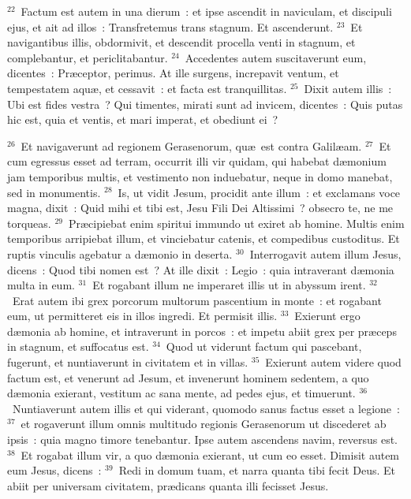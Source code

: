 ${}^{22}$~Factum est autem in una dierum~: et ipse ascendit in naviculam, et discipuli ejus, et ait ad illos~: Transfretemus trans stagnum. Et ascenderunt.
${}^{23}$~Et navigantibus illis, obdormivit, et descendit procella venti in stagnum, et complebantur, et periclitabantur.
${}^{24}$~Accedentes autem suscitaverunt eum, dicentes~: Pr\ae ceptor, perimus. At ille surgens, increpavit ventum, et tempestatem aqu\ae , et cessavit~: et facta est tranquillitas.
${}^{25}$~Dixit autem illis~: Ubi est fides vestra~? Qui timentes, mirati sunt ad invicem, dicentes~: Quis putas hic est, quia et ventis, et mari imperat, et obediunt ei~?


${}^{26}$~Et navigaverunt ad regionem Gerasenorum, qu\ae\ est contra Galil\ae am.
${}^{27}$~Et cum egressus esset ad terram, occurrit illi vir quidam, qui habebat d\ae monium jam temporibus multis, et vestimento non induebatur, neque in domo manebat, sed in monumentis.
${}^{28}$~Is, ut vidit Jesum, procidit ante illum~: et exclamans voce magna, dixit~: Quid mihi et tibi est, Jesu Fili Dei Altissimi~? obsecro te, ne me torqueas.
${}^{29}$~Pr\ae cipiebat enim spiritui immundo ut exiret ab homine. Multis enim temporibus arripiebat illum, et vinciebatur catenis, et compedibus custoditus. Et ruptis vinculis agebatur a d\ae monio in deserta.
${}^{30}$~Interrogavit autem illum Jesus, dicens~: Quod tibi nomen est~? At ille dixit~: Legio~: quia intraverant d\ae monia multa in eum.
${}^{31}$~Et rogabant illum ne imperaret illis ut in abyssum irent.
${}^{32}$~Erat autem ibi grex porcorum multorum pascentium in monte~: et rogabant eum, ut permitteret eis in illos ingredi. Et permisit illis.
${}^{33}$~Exierunt ergo d\ae monia ab homine, et intraverunt in porcos~: et impetu abiit grex per pr\ae ceps in stagnum, et suffocatus est.
${}^{34}$~Quod ut viderunt factum qui pascebant, fugerunt, et nuntiaverunt in civitatem et in villas.
${}^{35}$~Exierunt autem videre quod factum est, et venerunt ad Jesum, et invenerunt hominem sedentem, a quo d\ae monia exierant, vestitum ac sana mente, ad pedes ejus, et timuerunt.
${}^{36}$~Nuntiaverunt autem illis et qui viderant, quomodo sanus factus esset a legione~:
${}^{37}$~et rogaverunt illum omnis multitudo regionis Gerasenorum ut discederet ab ipsis~: quia magno timore tenebantur. Ipse autem ascendens navim, reversus est.
${}^{38}$~Et rogabat illum vir, a quo d\ae monia exierant, ut cum eo esset. Dimisit autem eum Jesus, dicens~:
${}^{39}$~Redi in domum tuam, et narra quanta tibi fecit Deus. Et abiit per universam civitatem, pr\ae dicans quanta illi fecisset Jesus.


